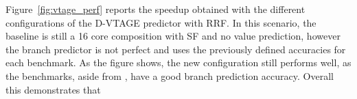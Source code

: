 Figure~\ref{fig:vtage_perf} reports the speedup obtained with the different configurations of the D-VTAGE predictor with RRF.
In this scenario, the baseline is still a 16 core composition with SF and no value prediction, however the branch predictor is not perfect and uses the previously defined accuracies for each benchmark.
As the figure shows, the new configuration still performs well, as the benchmarks, aside from , have a good branch prediction accuracy.
Overall this demonstrates that 




